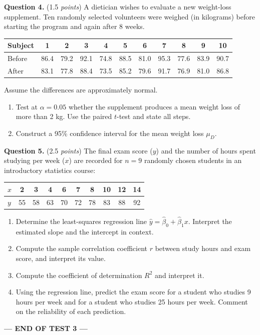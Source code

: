 \documentclass[12pt]{article}
\begin{document}
\textbf{Question 4.} (1.5 \emph{points})
A dietician wishes to evaluate a new weight-loss supplement. Ten
randomly selected volunteers were weighed (in kilograms) before
starting the program and again after 8 weeks.
\begin{center}
\begin{tabular}{l|cccccccccc}
Subject & 1 & 2 & 3 & 4 & 5 & 6 & 7 & 8 & 9 & 10 \\ \hline
Before  & 86.4 & 79.2 & 92.1 & 74.8 & 88.5 & 81.0 & 95.3 & 77.6 & 83.9 & 90.7 \\
After   & 83.1 & 77.8 & 88.4 & 73.5 & 85.2 & 79.6 & 91.7 & 76.9 & 81.0 & 86.8 \\
\end{tabular}
\end{center}
Assume the differences are approximately normal.
\begin{enumerate}[label=(\alph*),leftmargin=*]
  \item Test at $\alpha = 0.05$ whether the supplement produces a
        mean weight loss of more than 2 kg. Use the paired $t$-test
        and state all steps.
  \item Construct a 95\% confidence interval for the mean weight
        loss $\mu_D$.
\end{enumerate}

\textbf{Question 5.} (2.5 \emph{points})
The final exam score ($y$) and the number of hours spent studying per
week ($x$) are recorded for $n = 9$ randomly chosen students in an
introductory statistics course:
\begin{center}
\begin{tabular}{l|ccccccccc}
$x$ & 2 & 3 & 4 & 6 & 7 & 8 & 10 & 12 & 14 \\ \hline
$y$ & 55 & 58 & 63 & 70 & 72 & 78 & 83 & 88 & 92 \\
\end{tabular}
\end{center}
\begin{enumerate}[label=(\alph*),leftmargin=*]
  \item Determine the least-squares regression line
        $\hat{y} = \hat{\beta}_0 + \hat{\beta}_1 x$. Interpret the
        estimated slope and the intercept in context.
  \item Compute the sample correlation coefficient $r$ between study
        hours and exam score, and interpret its value.
  \item Compute the coefficient of determination $R^{2}$ and
        interpret it.
  \item Using the regression line, predict the exam score for a
        student who studies 9 hours per week and for a student who
        studies 25 hours per week. Comment on the reliability of
        each prediction.
\end{enumerate}

\vspace{10pt}
\begin{center}
\textbf{--- END OF TEST 3 ---}
\end{center}
\end{document}
